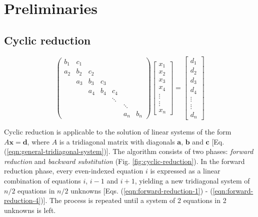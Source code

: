 \documentclass{elsarticle}
\begin{document}
\section{Preliminaries} \label{sec:preliminaries}

\subsection{Cyclic reduction} \label{subsec:cyclic-reduction}

\begin{equation} \label{eqn:general-tridiagonal-system}
\begin{pmatrix}
     b_1 & c_1  \\
     a_2 & b_2  &  c_2  \\
         & a_3  &  b_3 &  c_3  \\
         &      &  a_4 &  b_4 &  c_4  \\
         &      &      &      &  \ddots \\
         &      &      &      &     &  \ddots  \\
         &      &      &      &     &  a_n  &  b_n
\end{pmatrix}
\begin{bmatrix}
    x_1 \\
    x_2 \\
    x_3 \\
    x_4 \\
    \vdots \\
    \vdots \\
    x_n
 \end{bmatrix}
=
\begin{bmatrix}
   d_1 \\
   d_2 \\
   d_3 \\
   d_4 \\
   \vdots \\
   \vdots \\
   d_{n}
\end{bmatrix}
\end{equation}

Cyclic reduction is applicable to the solution of
linear systems of the form $A\bm{x} = \bm{d}$,
where $A$ is a tridiagonal matrix with diagonals
$\bm{a}$, $\bm{b}$ and $\bm{c}$
[Eq. (\ref{eqn:general-tridiagonal-system})].
The algorithm consists of two phases:
\emph{forward reduction} and \emph{backward substitution}
(Fig. \ref{fig:cyclic-reduction}).
In the forward reduction phase,
every even-indexed equation $i$
is expressed as a
linear combination of equations $i$, $i-1$ and $i+1$,
yielding a new tridiagonal system of
$n/2$ equations in $n/2$ unknowns
[Eqs. (\ref{eqn:forward-reduction-1}) - (\ref{eqn:forward-reduction-4})].
The process is repeated until a system of
2 equations in 2 unknowns is left.
\end{document}
